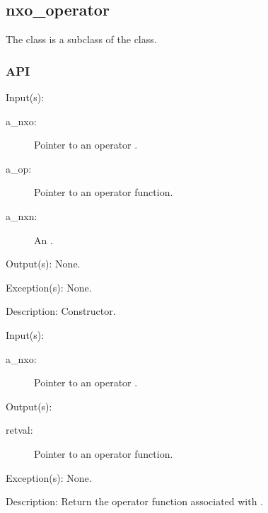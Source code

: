 %
%
%
%
%              

\subsection{nxo\_operator}
\label{nxo_operator}

The  class is a subclass of the  class.

\subsubsection{API}
\begin{capi}
\label{nxo_operator_new}
	\begin{capilist}
	\item[Input(s): ]
		\begin{description}\item[]
		\item[a\_nxo: ]
			Pointer to an operator .
		\item[a\_op: ]
			Pointer to an operator function.
		\item[a\_nxn: ]
			An .
		\end{description}
	\item[Output(s): ] None.
	\item[Exception(s): ] None.
	\item[Description: ]
		Constructor.
	\end{capilist}
\label{nxo_operator_f}
	\begin{capilist}
	\item[Input(s): ]
		\begin{description}\item[]
		\item[a\_nxo: ]
			Pointer to an operator \classname{nxo}.
		\end{description}
	\item[Output(s): ]
		\begin{description}\item[]
		\item[retval: ]
			Pointer to an operator function.
		\end{description}
	\item[Exception(s): ] None.
	\item[Description: ]
		Return the operator function associated with \cvar{a\_nxo}.
	\end{capilist}
\end{capi}
